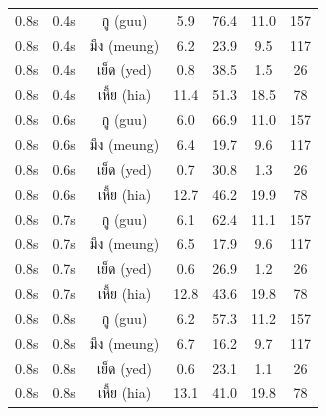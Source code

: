 \documentclass[11pt]{article}
\newcommand{\textthai}[1]{{\thaifont #1}}
\begin{document}
\begin{table}[H]
\begin{tabular}{|c|c|c|c|c|c|c|}
        \hline
        0.8s & 0.4s & \textthai{กู} (guu) & 5.9 & 76.4 & 11.0 & 157 \\
        0.8s & 0.4s & \textthai{มึง} (meung) & 6.2 & 23.9 & 9.5 & 117 \\
        0.8s & 0.4s & \textthai{เย็ด} (yed) & 0.8 & 38.5 & 1.5 & 26 \\
        0.8s & 0.4s & \textthai{เหี้ย} (hia) & 11.4 & 51.3 & 18.5 & 78 \\
        \hline
        0.8s & 0.6s & \textthai{กู} (guu) & 6.0 & 66.9 & 11.0 & 157 \\
        0.8s & 0.6s & \textthai{มึง} (meung) & 6.4 & 19.7 & 9.6 & 117 \\
        0.8s & 0.6s & \textthai{เย็ด} (yed) & 0.7 & 30.8 & 1.3 & 26 \\
        0.8s & 0.6s & \textthai{เหี้ย} (hia) & 12.7 & 46.2 & 19.9 & 78 \\
        \hline
        0.8s & 0.7s & \textthai{กู} (guu) & 6.1 & 62.4 & 11.1 & 157 \\
        0.8s & 0.7s & \textthai{มึง} (meung) & 6.5 & 17.9 & 9.6 & 117 \\
        0.8s & 0.7s & \textthai{เย็ด} (yed) & 0.6 & 26.9 & 1.2 & 26 \\
        0.8s & 0.7s & \textthai{เหี้ย} (hia) & 12.8 & 43.6 & 19.8 & 78 \\
        \hline
        0.8s & 0.8s & \textthai{กู} (guu) & 6.2 & 57.3 & 11.2 & 157 \\
        0.8s & 0.8s & \textthai{มึง} (meung) & 6.7 & 16.2 & 9.7 & 117 \\
        0.8s & 0.8s & \textthai{เย็ด} (yed) & 0.6 & 23.1 & 1.1 & 26 \\
        0.8s & 0.8s & \textthai{เหี้ย} (hia) & 13.1 & 41.0 & 19.8 & 78 \\
        \hline
    \end{tabular}
\end{table}
\end{document}
